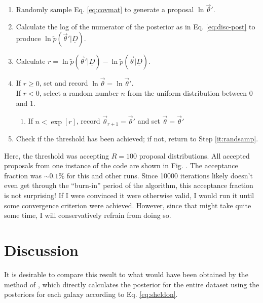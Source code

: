 \documentclass[12pt, onecolumn]{emulateapj}
\newcommand{\textul}{\underline}
\begin{document}
\begin{enumerate}
\item \label{it:randsamp} Randomly sample Eq. \ref{eq:covmat} to generate a proposal $\ln\vec{\theta}'$.
\item Calculate the log of the numerator of the posterior as in Eq. \ref{eq:disc-post} to produce $\ln\tilde{p}(\vec{\theta}'|\textul{D})$.
\item Calculate $r=\ln\tilde{p}(\vec{\theta}'|\textul{D})-\ln\tilde{p}(\vec{\theta}|\textul{D})$.
\item If $r\geq0$, set and record $\ln\vec{\theta}=\ln\vec{\theta}'$.\\
If $r<0$, select a random number $n$ from the uniform distribution between 0 and 1.
\begin{enumerate}
\item If $n<\exp[r]$, record $\vec{\theta}_{r+1}=\vec{\theta}'$ and set $\vec{\theta}=\vec{\theta}'$
\end{enumerate}
\item Check if the threshold has been achieved; if not, return to Step \ref{it:randsamp}.
\end{enumerate}

Here, the threshold was accepting $R=100$ proposal distributions.  All accepted proposals from one instance of the code are shown in Fig. %
.  The acceptance fraction was $\sim0.1\%$ for this and other runs.  Since 10000 iterations likely doesn't even get through the ``burn-in'' period of the algorithm, this acceptance fraction is not surprising!  If I were convinced it were otherwise valid, I would run it until some convergence criterion were achieved.  However, since that might take quite some time, I will conservatively refrain from doing so.


\section{Discussion}

It is desirable to compare this result to what would have been obtained by the method of \citet{she11}, which directly calculates the posterior for the entire dataset using the posteriors for each galaxy according to Eq. \ref{eq:sheldon}.
\end{document}
